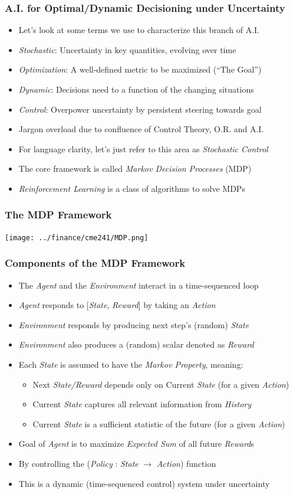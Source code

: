\documentclass[handout]{beamer}
\begin{document}
\begin{frame}
\frametitle{A.I. for Optimal/Dynamic Decisioning under Uncertainty}
\pause
\begin{itemize}[<+->]
\item Let's look at some terms we use to characterize this branch of A.I.
\item {\em Stochastic}: Uncertainty in key quantities, evolving over time
\item {\em Optimization}: A well-defined metric to be maximized (``The Goal'')
\item {\em Dynamic}:  Decisions need to a function of the changing situations
\item {\em Control}: Overpower uncertainty by persistent steering towards goal
\item Jargon overload due to confluence of Control Theory, O.R. and A.I.
\item For language clarity, let's just refer to this area as {\em Stochastic Control}
\item The core framework is called {\em Markov Decision Processes} (MDP)
\item {\em Reinforcement Learning} is a class of algorithms to solve MDPs
\end{itemize}
\end{frame}


\begin{frame}
\frametitle{The MDP Framework}
\texttt{[image: ../finance/cme241/MDP.png]}
\end{frame}

\begin{frame}
\frametitle{Components of the MDP Framework}
\pause
\begin{itemize}[<+->]
\item The {\em Agent} and the {\em Environment} interact in a time-sequenced loop
\item {\em Agent} responds to [{\em State}, {\em Reward}] by taking an {\em Action}
\item {\em Environment} responds by producing next step's (random) {\em State}
\item {\em Environment} also produces a (random) scalar denoted as {\em Reward}
\item Each {\em State} is assumed to have the {\em Markov Property}, meaning:
\begin{itemize}
\item Next {\em State/Reward} depends only on Current {\em State} (for a given {\em Action})
\item Current {\em State} captures all relevant information from {\em History}
\item Current {\em State} is a sufficient statistic of the future (for a given {\em Action})
\end{itemize} 
\item Goal of {\em Agent} is to maximize {\em Expected Sum} of all future {\em Reward}s
\item By controlling the ({\em Policy} : {\em State} $\rightarrow$ {\em Action}) function
\item This is a dynamic (time-sequenced control) system under uncertainty
\end{itemize}
\end{frame}
\end{document}
